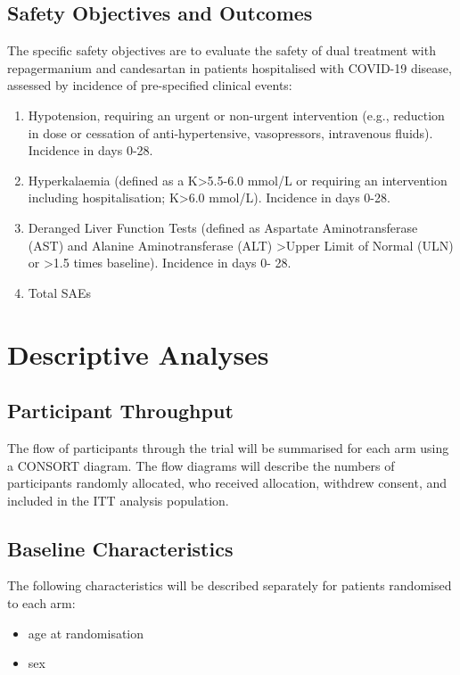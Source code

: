\documentclass[11pt,parskip=full-]{scrartcl}
\begin{document}
\subsection{Safety Objectives and Outcomes}
The specific safety objectives are to evaluate the safety of dual treatment with repagermanium and candesartan in patients hospitalised with COVID-19 disease, assessed by incidence of pre-specified clinical events:

\begin{enumerate}[resume]
    \item Hypotension, requiring an urgent or non-urgent intervention (e.g., reduction in dose or cessation of anti-hypertensive, vasopressors, intravenous fluids). Incidence in days 0-28.
    \item  Hyperkalaemia (defined as a K>5.5-6.0 mmol/L or requiring an intervention including hospitalisation; K>6.0 mmol/L). Incidence in days 0-28.
    \item Deranged Liver Function Tests (defined as Aspartate Aminotransferase (AST) and Alanine Aminotransferase (ALT) >Upper Limit of Normal (ULN) or >1.5 times baseline). Incidence in days 0- 28.
    \item Total SAEs
\end{enumerate}

\clearpage

\section{Descriptive Analyses}

\subsection{Participant Throughput}
The flow of participants through the trial will be summarised for each arm using a CONSORT diagram. The flow diagrams will describe the numbers of participants randomly allocated, who received allocation, withdrew consent, and included in the ITT analysis population.

\subsection{Baseline Characteristics}
The following characteristics will be described separately for patients randomised to each arm:
\begin{itemize}
    \item age at randomisation
    \item sex
\end{itemize}
\end{document}
